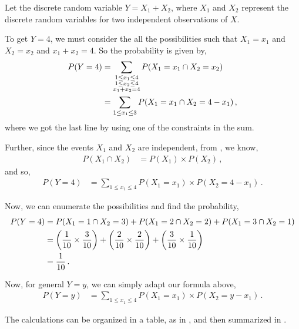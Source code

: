 \begin{subquestions}
\begin{subsubquestions}

\subsubquestion

Let the discrete random variable $Y= X_1 + X_2$, where $X_1$ and $X_2$ represent the discrete random variables for two independent observations of $X$. 

To get $Y=4$, we must consider the all the possibilities such that $X_1 = x_1$ and $X_2 =x_2$ and $x_1+x_2 = 4$. So the probability is given by,
\begin{align}
	P(Y=4) &= \sum_{\substack{1\leq x_1 \leq 4 \\1\leq x_2 \leq 4 \\ x_1+x_2=4}} P(X_1 = x_1 \cap X_2 = x_2) \nonumber \\
			 &= \sum_{1\leq x_1 \leq 3} P(X_1 = x_1 \cap X_2 = 4-x_1)\,,
\end{align}
where we got the last line by using one of the constraints in the sum.

Further, since the events $X_1$ and $X_2$ are independent, from , we know,
\begin{align}
	P(X_1 \cap X_2) &= P(X_1) \times P(X_2) \,,
\end{align}
and so,
\begin{align}
	P(Y=4) &= \sum_{1\leq x_1 \leq 4} P(X_1 = x_1) \times P(X_2 = 4-x_1)\,.
\end{align}

Now, we can enumerate the possibilities and find the probability,
\begin{align}
	P(Y=4) &= P(X_1 = 1 \cap X_2 = 3) + P(X_1 = 2 \cap X_2 = 2) + P(X_1 = 3 \cap X_2 = 1) \nonumber\\
		    &= \left( \frac{1}{10} \times \frac{3}{10} \right)+\left( \frac{2}{10} \times \frac{2}{10} \right)+\left( \frac{3}{10} \times \frac{1}{10} \right) \nonumber\\
		    &= \frac{1}{10} \,.
\end{align}




	

\subsubquestion
Now, for general $Y=y$, we can simply adapt our formula above,
\begin{align}
	P(Y=y) &= \sum_{1\leq x_1 \leq 4} P(X_1 = x_1) \times P(X_2 = y-x_1)\,.
\end{align}

The calculations can be organized in a table, as in , and then summarized in .


\end{subsubquestions}
\end{subquestions}
